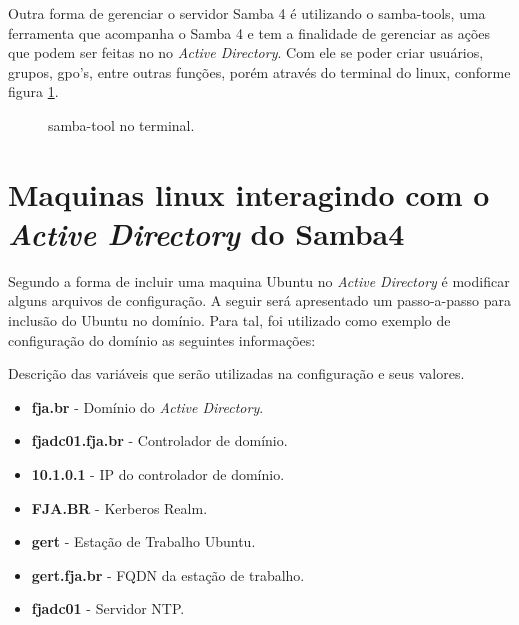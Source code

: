 Outra forma de gerenciar o servidor Samba 4 é utilizando o samba-tools, uma ferramenta que acompanha o Samba 4 e tem a finalidade de gerenciar as ações que podem ser feitas no no \textit{Active Directory}. Com ele se poder criar usuários, grupos, gpo's, entre outras funções, porém através do terminal do linux, conforme figura \ref{samba-tool}.

\begin{figure}[ht]
   	\centering
   	\caption{samba-tool no terminal.}
    \label{samba-tool}
\end{figure}

\section{Maquinas linux interagindo com o \textit{Active Directory} do  Samba4}

Segundo \cite{UBUNTU-WIKI} a forma de incluir uma maquina Ubuntu no \textit{Active Directory} é modificar alguns arquivos de configuração. A seguir será apresentado um passo-a-passo para inclusão do Ubuntu no domínio. Para tal, foi utilizado como exemplo de configuração do domínio as seguintes informações:

Descrição das variáveis que serão utilizadas na configuração e seus valores.

\begin{itemize}
	\item \textbf{fja.br} -  Domínio do \textit{Active Directory}.
	\item \textbf{fjadc01.fja.br} - Controlador de domínio.
	\item \textbf{10.1.0.1} - IP do controlador de domínio.
	\item \textbf{FJA.BR} - Kerberos Realm.
	\item \textbf{gert} - Estação de Trabalho Ubuntu.
	\item \textbf{gert.fja.br} - FQDN da estação de trabalho.
	\item \textbf{fjadc01} - Servidor NTP.
\end{itemize}

